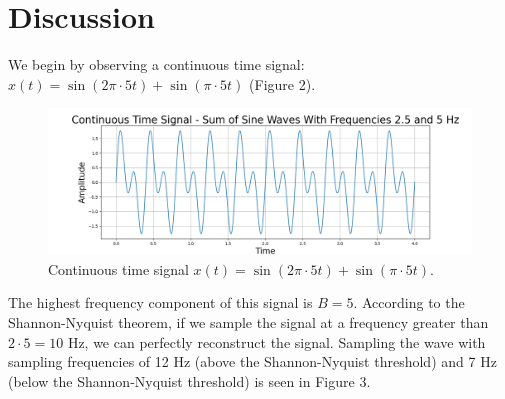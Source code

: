 \documentclass{article}
\begin{document}
\section{Discussion}


We begin by observing a continuous time signal: $x(t) = \sin(2\pi\cdot5t) + \sin(\pi\cdot5t)$ (Figure 2). 
\begin{figure}[H]
    \includegraphics[width=\linewidth]{images/ogtimedom.png}
    \caption{Continuous time signal $x(t) = \sin(2\pi\cdot5t) + \sin(\pi\cdot5t)$.}
    \label{fig:enter-label}
\end{figure}
The highest frequency component of this signal is $B = 5$. 
According to the Shannon-Nyquist theorem, if we sample the signal at a frequency greater than $2\cdot 5 = 10$ Hz, we can perfectly reconstruct the signal.
Sampling the wave with sampling frequencies of 12 Hz (above the Shannon-Nyquist threshold) and 7 Hz (below the Shannon-Nyquist threshold) is seen in Figure 3.
\end{document}
